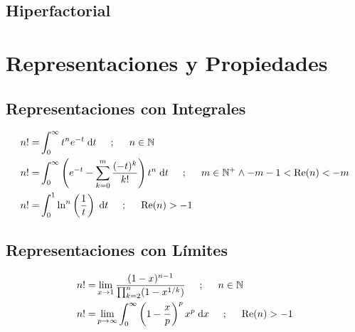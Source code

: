 \subsection{Hiperfactorial}







\section{Representaciones y Propiedades}



\subsection{Representaciones con Integrales}


\begin{align*}
	n!= & \int_{0}^{\infty} t^n e^{-t} \; \mbox{d}t \hspace{0.5cm} ;\hspace{.5cm}  n\in\mathbb{N}
	\\
	n!= & \int_{0}^{\infty} \left( e^{-t} - \sum_{k=0}^{m}\dfrac{(-t)^k}{k!} \right)t^{n} \; \mbox{d}t \hspace{0.5cm} ;\hspace{.5cm}  m\in\mathbb{N}^+ \wedge -m-1<\Re(n)<-m
	\\
	n!= & \int_{0}^{1} \ln^n\left(\dfrac{1}{t} \right)  \; \mbox{d}t \hspace{0.5cm} ;\hspace{.5cm} \Re(n)>-1
\end{align*}

\subsection{Representaciones con Límites}

\begin{align*}
	n!= & \lim\limits_{x \to 1} \dfrac{(1-x)^{n-1}}{ \prod_{k=2}^{n} (1-x^{1/k})}\hspace{0.5cm} ; \hspace{.5cm} n\in\mathbb{N}
	\\
	n!= & \lim\limits_{p \to \infty} \int_{0}^{\infty} \left(1-\dfrac{x}{p} \right)^{p } x^p \; \mbox{d}x   \hspace{0.5cm} ; \hspace{.5cm} \Re(n)>-1
\end{align*}





